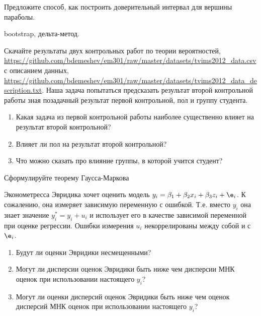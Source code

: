 \documentclass[pdftex,11pt,openany]{book}\usepackage[]{graphicx}\usepackage[]{color}
\begin{document}
\begin{solution}
\end{solution}


\begin{problem}
Предложите способ, как построить доверительный интервал для вершины параболы.
\end{problem}

\begin{solution}
bootstrap, дельта-метод.
\end{solution}


\begin{problem}
Скачайте результаты двух контрольных работ по теории вероятностей, \url{https://github.com/bdemeshev/em301/raw/master/datasets/tvims2012_data.csv} с описанием данных, \url{https://github.com/bdemeshev/em301/raw/master/datasets/tvims2012_data_description.txt}. Наша задача попытаться предсказать результат второй контрольной работы зная позадачный результат первой контрольной, пол и группу студента. 
\begin{enumerate}
\item Какая задача из первой контрольной работы наиболее существенно влияет на результат второй контрольной?
\item Влияет ли пол на результат второй контрольной?
\item Что можно сказать про влияние группы, в которой учится студент?
\end{enumerate}
\end{problem}

\begin{solution}
\end{solution}

\begin{problem}
Сформулируйте теорему Гаусса-Маркова
\end{problem}

\begin{solution}
\end{solution}


\begin{problem}
Эконометресса Эвридика хочет оценить модель $y_i=\beta_1 + \beta_2 x_i +\beta_3 z_i + \e_i$. К сожалению, она измеряет зависимую переменную с ошибкой. Т.е. вместо $y_i$ она знает значение $y_i^*=y_i+u_i$ и использует его в качестве зависимой переменной при оценке регрессии. Ошибки измерения $u_i$ некоррелированы между собой и с $\e_i$. 
\begin{enumerate}
\item Будут ли оценки Эвридики несмещенными?
\item Могут ли дисперсии оценок Эвридики быть ниже чем дисперсии МНК оценок при использовании настоящего $y_i$?
\item Могут ли оценки дисперсий оценок Эвридики быть ниже чем оценок дисперсий МНК оценок при использовании настоящего $y_i$?
\end{enumerate}
\end{problem}
\end{document}
